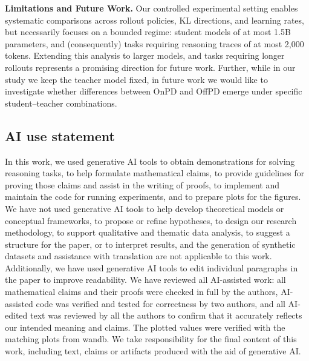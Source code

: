 \documentclass{article} %
\theoremstyle{plain}
\theoremstyle{definition}
\theoremstyle{remark}
\begin{document}
\textbf{Limitations and Future Work.} Our controlled experimental setting enables systematic comparisons across rollout policies, KL directions, and learning rates, but necessarily focuses on a bounded regime: student models of at most 1.5B parameters, and (consequently) tasks requiring reasoning traces of at most 2,000 tokens. 
Extending this analysis to larger models, and tasks requiring longer rollouts represents a promising direction for future work. Further, while in our study we keep the teacher model fixed, in future work we would like to investigate whether differences between OnPD and OffPD emerge under specific student--teacher combinations.





\subsection*{AI use statement}

In this work, we used generative AI tools to obtain demonstrations for solving reasoning tasks, to help formulate mathematical claims, to provide guidelines for proving those claims and assist in the writing of proofs, to implement and maintain the code for running experiments, and to prepare plots for the figures. We have not used generative AI tools to help develop theoretical models or conceptual frameworks, to propose or refine hypotheses, to design our research methodology, to support qualitative and thematic data analysis, to suggest a structure for the paper, or to interpret results, and the generation of synthetic datasets and assistance with translation are not applicable to this work. Additionally, we have used generative AI tools to edit individual paragraphs in the paper to improve readability. We have reviewed all AI-assisted work: all mathematical claims and their proofs were checked in full by the authors, AI-assisted code was verified and tested for correctness by two authors, and all AI-edited text was reviewed by all the authors to confirm that it accurately reflects our intended meaning and claims. The plotted values were verified with the matching plots from wandb. We take responsibility for the final content of this work, including text, claims or artifacts produced with the aid of generative AI.
\end{document}
